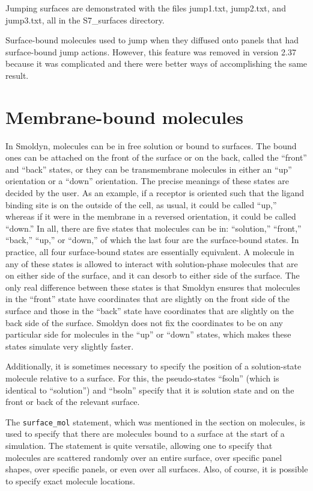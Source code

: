 \documentclass {scrbook}
\newcommand {\ttt} {\texttt}
\begin{document}
Jumping surfaces are demonstrated with the files jump1.txt, jump2.txt, and jump3.txt, all in the S7\_surfaces directory.

Surface-bound molecules used to jump when they diffused onto panels that had surface-bound jump actions. However, this feature was removed in version 2.37 because it was complicated and there were better ways of accomplishing the same result.

\section{Membrane-bound molecules}

In Smoldyn, molecules can be in free solution or bound to surfaces. The bound ones can be attached on the front of the surface or on the back, called the ``front'' and ``back'' states, or they can be transmembrane molecules in either an ``up'' orientation or a ``down'' orientation. The precise meanings of these states are decided by the user. As an example, if a receptor is oriented such that the ligand binding site is on the outside of the cell, as usual, it could be called ``up,'' whereas if it were in the membrane in a reversed orientation, it could be called ``down.'' In all, there are five states that molecules can be in: ``solution,'' ``front,'' ``back,'' ``up,'' or ``down,'' of which the last four are the surface-bound states. In practice, all four surface-bound states are essentially equivalent. A molecule in any of these states is allowed to interact with solution-phase molecules that are on either side of the surface, and it can desorb to either side of the surface. The only real difference between these states is that Smoldyn ensures that molecules in the ``front'' state have coordinates that are slightly on the front side of the surface and those in the ``back'' state have coordinates that are slightly on the back side of the surface. Smoldyn does not fix the coordinates to be on any particular side for molecules in the ``up'' or ``down'' states, which makes these states simulate very slightly faster.

Additionally, it is sometimes necessary to specify the position of a solution-state molecule relative to a surface. For this, the pseudo-states ``fsoln'' (which is identical to ``solution'') and ``bsoln'' specify that it is solution state and on the front or back of the relevant surface.

The \ttt{surface\_mol} statement, which was mentioned in the section on molecules, is used to specify that there are molecules bound to a surface at the start of a simulation. The statement is quite versatile, allowing one to specify that molecules are scattered randomly over an entire surface, over specific panel shapes, over specific panels, or even over all surfaces. Also, of course, it is possible to specify exact molecule locations.
\end{document}
